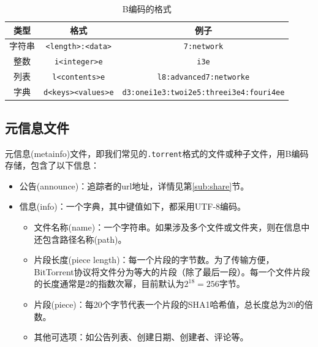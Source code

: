 \documentclass[thesis]{thesis}
\begin{document}
	\begin{table}[htbp]
		\caption{B编码的格式}
		\label{tab:bencoding}
		\centering
		\begin{tabular}{|c|c|c|}\hline
			\textbf{类型} & \textbf{格式} & \textbf{例子}\\\hline
			字符串 & \verb'<length>:<data>' & \verb'7:network'\\\hline
			整数 & \verb'i<integer>e' & \verb'i3e'\\\hline
			列表 & \verb'l<contents>e' & \verb'l8:advanced7:networke'\\\hline
			字典 & \verb'd<keys><values>e' & \verb'd3:onei1e3:twoi2e5:threei3e4:fouri4ee'\\\hline
		\end{tabular}
	\end{table}
	
	\subsection{元信息文件}
	\label{sub:metainfo}
	元信息(metainfo)文件，即我们常见的\verb'.torrent'格式的文件或种子文件，用B编码存储，包含了以下信息：
	\begin{itemize}
		\item 公告(announce)：追踪者的url地址，详情见第\ref{sub:share}节。
		\item 信息(info)：一个字典，其中键值如下，都采用UTF-8编码。
		\begin{itemize}
			\item 文件名称(name)：一个字符串。如果涉及多个文件或文件夹，则在信息中还包含路径名称(path)。
			\item 片段长度(piece length)：每一个片段的字节数。为了传输方便，BitTorrent协议将文件分为等大的片段（除了最后一段）。每一个文件片段的长度通常是2的指数次幂，目前默认为$2^{18}=256$字节。
			\item 片段(piece)：每20个字节代表一个片段的SHA1哈希值，总长度总为20的倍数。
			\item 其他可选项：如公告列表、创建日期、创建者、评论等。
		\end{itemize}
	\end{itemize}
	
\end{document}
